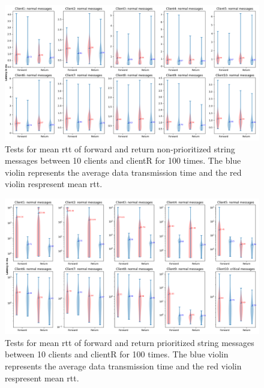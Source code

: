 \begin{figure}
    \centering
    \includegraphics[width=\textheight]{figures/tests/priority_tests/violin_10clients_string_non_priority.png}\hfill 
    \caption{Tests for mean \gls{rtt} of forward and return non-prioritized string messages between 10 clients 
    and clientR for 100 times. The blue violin represents the average data transmission time and the red violin 
    respresent mean \gls{rtt}.} \label{fig: priority-10clients-a}
\end{figure}
\begin{figure}
    \includegraphics[width=\textheight]{figures/tests/priority_tests/log_violin_10clients_string_priority.png}\hfill 
    \caption{Tests for mean \gls{rtt} of forward and return prioritized string messages between 10 clients 
    and clientR for 100 times. The blue violin represents the average data transmission time and the red violin 
    respresent mean \gls{rtt}.} \label{fig: priority-10clients-b}
\end{figure}



